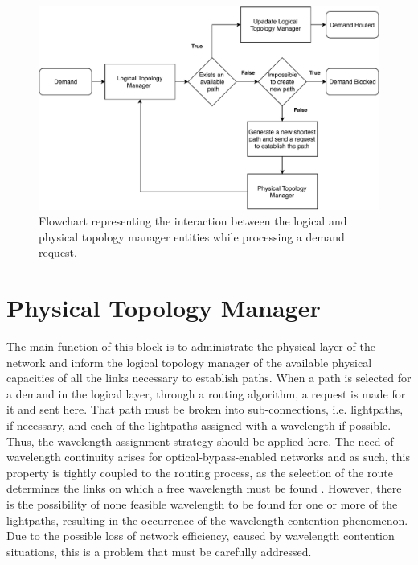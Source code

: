 \begin{figure}[H]
  \begin{center}
    \includegraphics[width=1\textwidth]{fig/logos/LogicalTopologyManager.pdf}
    \caption{Flowchart representing the interaction between the logical and physical topology manager entities while processing a demand request.}
  \end{center}
  \label{logicalTopologyManager}
\end{figure}

\section{Physical Topology Manager}
\label{physicalTopologyManager}

The main function of this block is to administrate the physical layer of the network and inform the logical topology manager of the available physical capacities of all the links necessary to establish paths. When a path is selected for a demand in the logical layer, through a routing algorithm, a request is made for it and sent here. That path must be broken into sub-connections, i.e. lightpaths, if necessary, and each of the lightpaths assigned with a wavelength if possible. Thus, the wavelength assignment strategy should be applied here. The need of wavelength continuity arises for optical-bypass-enabled networks and as such, this property is tightly coupled to the routing process, as the selection of the route determines the links on which a free wavelength must be found \cite{SimmonsJane2008}. However, there is the possibility of none feasible wavelength to be found for one or more of the lightpaths, resulting in the occurrence of the wavelength contention phenomenon. Due to the possible loss of network efficiency, caused by wavelength contention situations, this is a problem that must be carefully addressed. 

